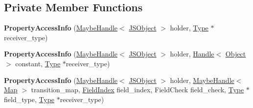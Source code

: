 \subsection*{Private Member Functions}
\begin{DoxyCompactItemize}
\item 
{\bfseries Property\+Access\+Info} (\hyperlink{classv8_1_1internal_1_1_maybe_handle}{Maybe\+Handle}$<$ \hyperlink{classv8_1_1internal_1_1_j_s_object}{J\+S\+Object} $>$ holder, \hyperlink{classv8_1_1internal_1_1_type}{Type} $\ast$receiver\+\_\+type)\hypertarget{classv8_1_1internal_1_1compiler_1_1_property_access_info_ab5b4220b0884173fba3d1f7135f77814}{}\label{classv8_1_1internal_1_1compiler_1_1_property_access_info_ab5b4220b0884173fba3d1f7135f77814}

\item 
{\bfseries Property\+Access\+Info} (\hyperlink{classv8_1_1internal_1_1_maybe_handle}{Maybe\+Handle}$<$ \hyperlink{classv8_1_1internal_1_1_j_s_object}{J\+S\+Object} $>$ holder, \hyperlink{classv8_1_1internal_1_1_handle}{Handle}$<$ \hyperlink{classv8_1_1internal_1_1_object}{Object} $>$ constant, \hyperlink{classv8_1_1internal_1_1_type}{Type} $\ast$receiver\+\_\+type)\hypertarget{classv8_1_1internal_1_1compiler_1_1_property_access_info_a6e472b5097c63b756b0bea15cce24c67}{}\label{classv8_1_1internal_1_1compiler_1_1_property_access_info_a6e472b5097c63b756b0bea15cce24c67}

\item 
{\bfseries Property\+Access\+Info} (\hyperlink{classv8_1_1internal_1_1_maybe_handle}{Maybe\+Handle}$<$ \hyperlink{classv8_1_1internal_1_1_j_s_object}{J\+S\+Object} $>$ holder, \hyperlink{classv8_1_1internal_1_1_maybe_handle}{Maybe\+Handle}$<$ \hyperlink{classv8_1_1internal_1_1_map}{Map} $>$ transition\+\_\+map, \hyperlink{classv8_1_1internal_1_1_field_index}{Field\+Index} field\+\_\+index, Field\+Check field\+\_\+check, \hyperlink{classv8_1_1internal_1_1_type}{Type} $\ast$field\+\_\+type, \hyperlink{classv8_1_1internal_1_1_type}{Type} $\ast$receiver\+\_\+type)\hypertarget{classv8_1_1internal_1_1compiler_1_1_property_access_info_a1ef0a41d7aaa4f027bd9cca4a9706860}{}\label{classv8_1_1internal_1_1compiler_1_1_property_access_info_a1ef0a41d7aaa4f027bd9cca4a9706860}

\end{DoxyCompactItemize}
